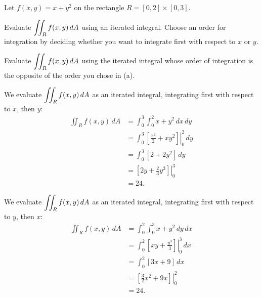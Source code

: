 \begin{activity} \label{A:11.2.2} Let $f(x,y) = x+y^2$ on the rectangle $R = [0,2] \times [0,3]$.
	\ba
	\item Evaluate $\displaystyle \iint_R f(x,y) \, dA$ using an iterated integral.  Choose an order for integration by deciding whether you want to integrate first with respect to $x$ or $y$.  
	
	\item Evaluate $\displaystyle \iint_R f(x,y) \, dA$ using the iterated integral whose order of integration is the opposite of the order you chose in (a).	
	
	\ea

\end{activity}
\begin{smallhint}

\end{smallhint}
\begin{bighint}

\end{bighint}
\begin{activitySolution}
	\ba
	\item We evaluate $\displaystyle \iint_R f(x,y) \, dA$ as an iterated integral, integrating first with respect to $x$, then $y$:
	\begin{align*}
	 \iint_R f(x,y) \, dA &=  \int_{0}^{3} \int_{0}^{2} x+y^2 \, dx \, dy \\
		&= \int_{0}^{3} \left. \left[ \frac{x^2}{2} + xy^2 \right] \right|_{0}^{2}  \, dy \\
		&= \int_{0}^{3} \left[ 2 + 2y^2 \right]  \, dy \\
		&= \left. \left[ 2y + \frac{2}{3}y^3 \right] \right|_{0}^{3} \\
		&= 24.
	\end{align*}
	
	
	
	\item We evaluate $\displaystyle \iint_R f(x,y) \, dA$ as an iterated integral, integrating first with respect to $y$, then $x$:
	\begin{align*}
	 \iint_R f(x,y) \, dA &=  \int_{0}^{2} \int_{0}^{3} x+y^2 \, dy \, dx \\
		&= \int_{0}^{2} \left. \left[ xy + \frac{y^3}{3} \right] \right|_{0}^{3}  \, dx \\
		&= \int_{0}^{2} \left[ 3x + 9 \right]  \, dx \\
		&= \left. \left[ \frac{3}{2}x^2 + 9x \right] \right|_{0}^{2} \\
		&= 24.
	\end{align*}
	\ea
\end{activitySolution}
\aftera
